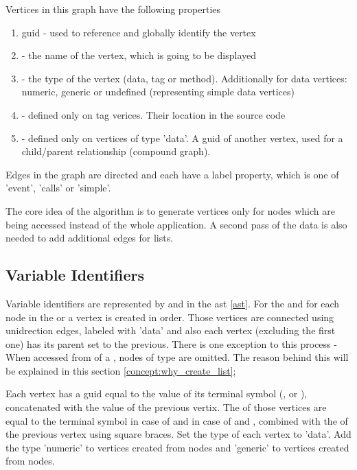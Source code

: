 Vertices in this graph have the following properties
\label{concept:interaction_diagram_structure}
\begin{enumerate}
    \item \gls{guid} - used to reference and globally identify the vertex 
    \item {} - the name of the vertex, which is going to be displayed
    \item {} - the type of the vertex (data, tag or method). Additionally for data vertices: numeric, generic or undefined (representing simple data vertices)
    \item {} - defined only on tag verices. Their location in the source code
    \item {} - defined only on vertices of type 'data'. A \gls{guid} of another vertex, used for a child/parent relationship (compound graph).
\end{enumerate}

Edges in the graph are directed and each have a label property, which is one of 'event', 'calls' or 'simple'. 

The core idea of the algorithm is to generate vertices only for nodes which are being accessed instead of the whole application. A second pass of the data is also needed to add additional edges for lists. 

\subsection{Variable Identifiers}
\label{concept:variable_identifiers}
Variable identifiers are represented by  and  in the \gls{ast} \ref{ast}. For the  and for each  node in the  or  a vertex is created in order. 
Those vertices are connected using unidrection edges, labeled with 'data' and also each vertex (excluding the first one) has its parent set to the previous. There is one exception to this process - When accessed from  of a , nodes of type  are omitted. The reason behind this will be explained in this section \ref{concept:why_create_list};


Each vertex has a \gls{guid} equal to the value of its terminal symbol (,  or ), concatenated with the value of the previous vertix.
The  of those vertices are equal to the terminal symbol in case of  and in case of  and , combined with the  of the previous vertex using square braces. Set the type of each vertex to 'data'. Add the type 'numeric' to vertices created from  nodes and 'generic' to vertices created from  nodes. 

